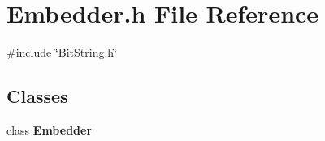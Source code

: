 \section{Embedder.\+h File Reference}
\label{Embedder_8h}
{\ttfamily \#include \char`\"{}Bit\+String.\+h\char`\"{}}\newline
\subsection*{Classes}
\begin{DoxyCompactItemize}
\item 
class \textbf{ Embedder}
\end{DoxyCompactItemize}
